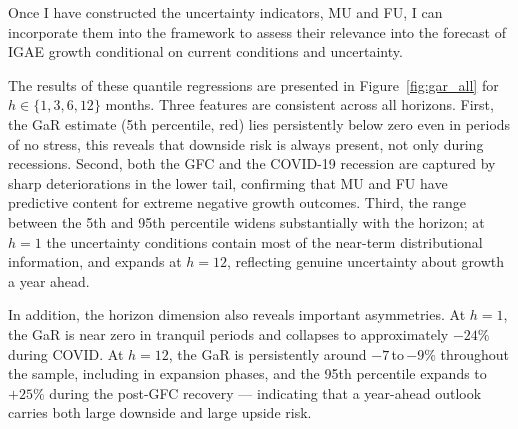 \documentclass[12pt]{article}
\begin{document}
Once I have constructed the uncertainty indicators, MU and FU, I can incorporate them into the \cite{adrian2019vulnerable} framework to assess their relevance into the forecast of IGAE growth conditional on current conditions and uncertainty. 




The results of these quantile regressions are presented in Figure~\ref{fig:gar_all} for $h \in \{1, 3, 6, 12\}$ months. Three features are consistent across all
horizons. First, the GaR estimate (5th percentile, red) lies persistently
below zero even in periods of no stress, this reveals that downside risk is always present, not only
during recessions. Second, both the GFC and the COVID-19 recession are
captured by sharp deteriorations in the lower tail, confirming that
 MU and FU have predictive content for extreme negative growth
outcomes. Third, the range between the 5th and 95th percentile widens substantially with the horizon; at $h=1$ the uncertainty conditions
contain most of the near-term distributional information, and expands at $h = 12$, reflecting genuine uncertainty about growth a year
ahead.


In addition, the horizon dimension also reveals  important asymmetries. At $h = 1$, the GaR is near zero in tranquil periods and collapses to approximately
$-24\%$ during COVID. At $h = 12$, the GaR is persistently around $-7$\,to\,$-9\%$ throughout the sample, including in expansion phases,
and the 95th percentile expands to $+25\%$ during the post-GFC recovery ---
indicating that a year-ahead outlook carries both large downside and
large upside risk. 
\end{document}
